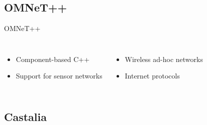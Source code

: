 \documentclass{beamer}
\begin{document}
\begin{frame}

\end{frame}


\subsection{OMNeT++}

\begin{frame}


\begin{block}{OMNeT++}

\begin{columns}[c] %

	\begin{itemize}
		\item Component-based C++
		\item Support for sensor networks
	\end{itemize}
\begin{itemize}
		\item Wireless ad-hoc networks
		\item Internet protocols
	\end{itemize}
\end{columns}
\end{block}
\end{frame}

\subsection{Castalia}
\end{document}
